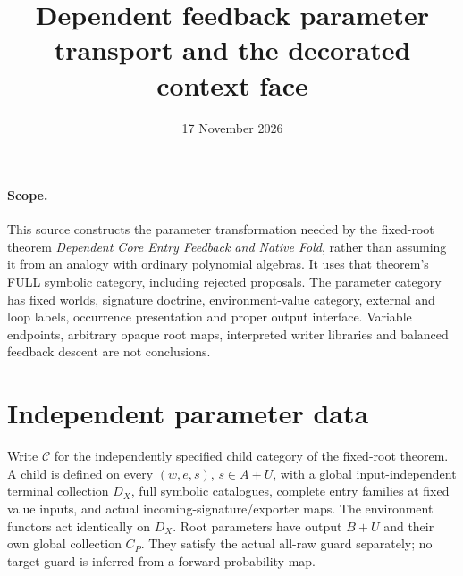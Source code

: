\documentclass[11pt]{article}
\title{Dependent feedback parameter transport and the decorated context face}
\date{17 November 2026}
\begin{document}
\maketitle
\paragraph{Scope.}
This source constructs the parameter transformation needed by the fixed-root theorem \emph{Dependent Core Entry Feedback and Native Fold}, rather than assuming it from an analogy with ordinary polynomial algebras. It uses that theorem's FULL symbolic category, including rejected proposals. The parameter category has fixed worlds, signature doctrine, environment-value category, external and loop labels, occurrence presentation and proper output interface. Variable endpoints, arbitrary opaque root maps, interpreted writer libraries and balanced feedback descent are not conclusions.

\section{Independent parameter data}
Write $\mathcal C$ for the independently specified child category of the fixed-root theorem. A child is defined on every $(w,e,s)$, $s\in A+U$, with a global input-independent terminal collection $D_X$, full symbolic catalogues, complete entry families at fixed value inputs, and actual incoming-signature/exporter maps. The environment functors act identically on $D_X$. Root parameters have output $B+U$ and their own global collection $C_P$. They satisfy the actual all-raw guard separately; no target guard is inferred from a forward probability map.
\end{document}
